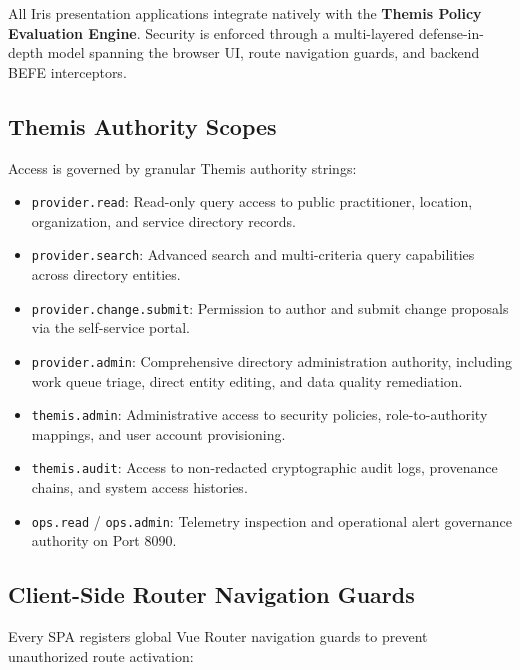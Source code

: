 All Iris presentation applications integrate natively with the \textbf{Themis Policy Evaluation Engine}. Security is enforced through a multi-layered defense-in-depth model spanning the browser UI, route navigation guards, and backend BEFE interceptors.

\subsection{Themis Authority Scopes}

Access is governed by granular Themis authority strings:

\begin{itemize}
    \item \texttt{provider.read}: Read-only query access to public practitioner, location, organization, and service directory records.
    \item \texttt{provider.search}: Advanced search and multi-criteria query capabilities across directory entities.
    \item \texttt{provider.change.submit}: Permission to author and submit change proposals via the self-service portal.
    \item \texttt{provider.admin}: Comprehensive directory administration authority, including work queue triage, direct entity editing, and data quality remediation.
    \item \texttt{themis.admin}: Administrative access to security policies, role-to-authority mappings, and user account provisioning.
    \item \texttt{themis.audit}: Access to non-redacted cryptographic audit logs, provenance chains, and system access histories.
    \item \texttt{ops.read} / \texttt{ops.admin}: Telemetry inspection and operational alert governance authority on Port 8090.
\end{itemize}

\subsection{Client-Side Router Navigation Guards}

Every SPA registers global Vue Router navigation guards to prevent unauthorized route activation:


